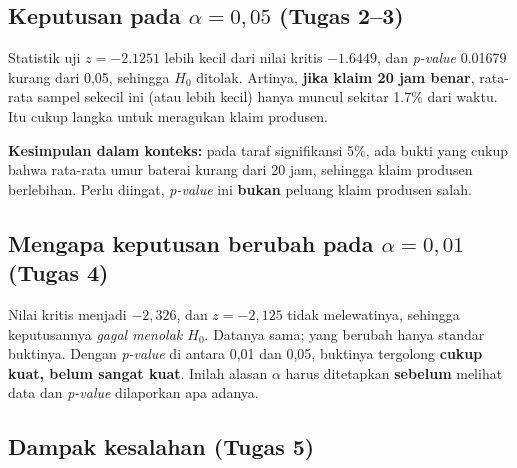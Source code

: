 \documentclass[
  indonesian,
  letterpaper,
]{book}
\begin{document}
\subsection{\texorpdfstring{Keputusan pada \(\alpha = 0{,}05\) (Tugas
2--3)}{Keputusan pada \textbackslash alpha = 0\{,\}05 (Tugas 2--3)}}\label{keputusan-pada-alpha-005-tugas-23}

Statistik uji \(z = -2.1251\) lebih kecil dari nilai kritis \(-1.6449\),
dan \emph{p-value} 0.01679 kurang dari 0,05, sehingga \(H_0\) ditolak.
Artinya, \textbf{jika klaim 20 jam benar}, rata-rata sampel sekecil ini
(atau lebih kecil) hanya muncul sekitar 1.7\% dari waktu. Itu cukup
langka untuk meragukan klaim produsen.

\textbf{Kesimpulan dalam konteks:} pada taraf signifikansi 5\%, ada
bukti yang cukup bahwa rata-rata umur baterai kurang dari 20 jam,
sehingga klaim produsen berlebihan. Perlu diingat, \emph{p-value} ini
\textbf{bukan} peluang klaim produsen salah.

\subsection{\texorpdfstring{Mengapa keputusan berubah pada
\(\alpha = 0{,}01\) (Tugas
4)}{Mengapa keputusan berubah pada \textbackslash alpha = 0\{,\}01 (Tugas 4)}}\label{mengapa-keputusan-berubah-pada-alpha-001-tugas-4}

Nilai kritis menjadi \(-2{,}326\), dan \(z = -2{,}125\) tidak
melewatinya, sehingga keputusannya \emph{gagal menolak \(H_0\)}. Datanya
sama; yang berubah hanya standar buktinya. Dengan \emph{p-value} di
antara 0,01 dan 0,05, buktinya tergolong \textbf{cukup kuat, belum
sangat kuat}. Inilah alasan \(\alpha\) harus ditetapkan \textbf{sebelum}
melihat data dan \emph{p-value} dilaporkan apa adanya.

\subsection{Dampak kesalahan (Tugas 5)}\label{dampak-kesalahan-tugas-5}
\end{document}
